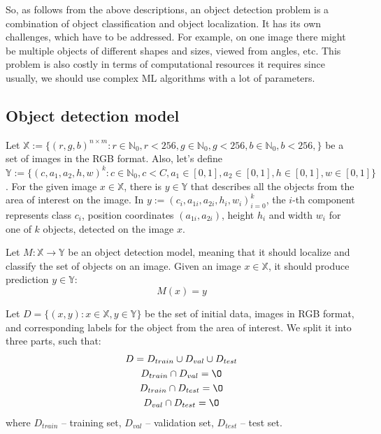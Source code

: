 \documentclass[14pt,a4paper]{extarticle}
\newcounter{e}
\numberwithin{equation}{section}
\numberwithin{figure}{section}
\begin{document}
So, as follows from the above descriptions, an object detection problem is a combination of object classification and object localization. It has its own challenges, which have to be addressed. For example, on one image there might be multiple objects of different shapes and sizes, viewed from angles, etc. This problem is also costly in terms of computational resources it requires since usually, we should use complex ML algorithms with a lot of parameters.

\subsection{Object detection model}

Let $\mathbb{X} := \{(r, g, b)^{n \times m} : r \in \mathbb{N}_0, r < 256,  g \in \mathbb{N}_0, g < 256, b \in \mathbb{N}_0, b < 256, \}$ be a set of images in the RGB format. Also, let's define $\mathbb{Y}:=\{(c, a_{1}, a_{2}, h, w)^k : c \in \mathbb{N}_0, c<C, a_1 \in [0, 1], a_2 \in [0, 1], h \in [0, 1], w \in [0, 1]\}$. For the given image $x \in \mathbb{X}$, there is $y \in \mathbb{Y}$ that describes all the objects from the area of interest on the image. In $y:=(c_i, a_{1i}, a_{2i}, h_i, w_i)^k_{i=0}$, the $i$-th component represents class $c_i$, position coordinates $(a_{1i}, a_{2i})$, height $h_i$ and width $w_i$ for one of $k$ objects, detected on the image $x$.

Let $M: \mathbb{X} \rightarrow \mathbb{Y}$ be an object detection model, meaning that it should localize and classify the set of objects on an image. Given an image $x \in \mathbb{X}$, it should produce prediction $y \in \mathbb{Y}$:
\begin{equation}
    M(x)=y
\end{equation}

Let $D = \{(x, y): x \in \mathbb{X}, y \in \mathbb{Y}\}$ be the set of initial data, images in RGB format, and corresponding labels for the object from the area of interest. We split it into three parts, such that:
\begin{equation}
    \begin{gathered}
        D = D_{train} \cup D_{val} \cup D_{test} \\
        D_{train} \cap D_{val} = \O\\
        D_{train} \cap D_{test} = \O\\
        D_{val} \cap D_{test} = \O\\
    \end{gathered}
\end{equation}
where $D_{train}$ -- training set, $D_{val}$ --  validation set, $D_{test}$ -- test set.
\end{document}
